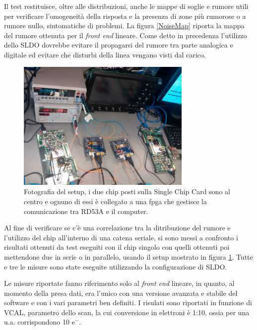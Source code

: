 Il test restituisce, oltre alle distribuzioni, anche le mappe di soglie e rumore utili per verificare l'omogeneità della risposta e la presenza di zone più rumorose o a rumore nullo, sintomatiche di problemi.
La figura \ref{NoiseMap} riporta la mappa del rumore ottenuta per il \textit{front end} lineare. 
Come detto in precedenza l'utilizzo dello SLDO dovrebbe evitare il propagarsi del rumore tra parte analogica e digitale ed evitare che disturbi della linea vengano visti dal carico. 
\begin{figure}
\centering
\includegraphics[width=0.75\textwidth]{Immagini/chipserial}
\caption{Fotografia del setup, i due chip posti sulla Single Chip Card sono al centro e ognuno di essi è collegato a una fpga che gestisce la comunicazione tra RD53A e il computer.}
\label{chipserial}
\end{figure}
Al fine di verificare se c'è una correlazione tra la ditribuzione del rumore e l'utilizzo del chip all'interno di una catena seriale, si sono messi a confronto i risultati ottenuti da test eseguiti con il chip singolo con quelli ottenuti poi mettendone due in serie o in parallelo, usando il setup mostrato in figura \ref{chipserial}.
Tutte e tre le misure sono state eseguite utilizzando la configurazione di SLDO. 

Le misure riportate fanno riferimento solo al \textit{front end} lineare, in quanto, al momento della presa dati, era l'unico con una versione avanzata e stabile del software e con i vari parametri ben definiti.
I risulati sono riportati in funzione di VCAL, parametro dello scan, la cui conversione in elettroni è 1:10, ossia per una u.a. corrispondono 10 $\mathrm{e^{-}}$.

